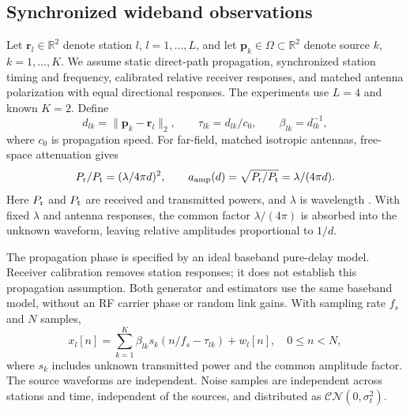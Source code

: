 \documentclass[a4paper,fleqn,review]{cas-sc}
\newcommand{\R}{\mathbb R}
\begin{document}
\subsection{Synchronized wideband observations}
Let $\bm r_l\in\R^2$ denote station $l$, $l=1,\ldots,L$, and let $\bm p_k\in\Omega\subset\R^2$ denote source $k$, $k=1,\ldots,K$. We assume static direct-path propagation, synchronized station timing and frequency, calibrated relative receiver responses, and matched antenna polarization with equal directional responses. The experiments use $L=4$ and known $K=2$. Define
\begin{equation}
d_{lk}=\|\bm p_k-\bm r_l\|_2,\qquad
\tau_{lk}=d_{lk}/c_0,\qquad \beta_{lk}=d_{lk}^{-1},
\label{en:distance}
\end{equation}
where $c_0$ is propagation speed. For far-field, matched isotropic antennas, free-space attenuation gives
\begin{equation}
P_{\rm r}/P_{\rm t}=(\lambda/4\pi d)^2,\qquad
a_{\rm amp}(d)=\sqrt{P_{\rm r}/P_{\rm t}}=\lambda/(4\pi d).
\label{en:freespace}
\end{equation}
Here $P_{\rm r}$ and $P_{\rm t}$ are received and transmitted powers, and $\lambda$ is wavelength \cite{ITURP5252024}. With fixed $\lambda$ and antenna responses, the common factor $\lambda/(4\pi)$ is absorbed into the unknown waveform, leaving relative amplitudes proportional to $1/d$.

The propagation phase is specified by an ideal baseband pure-delay model. Receiver calibration removes station responses; it does not establish this propagation assumption. Both generator and estimators use the same baseband model, without an RF carrier phase or random link gains. With sampling rate $f_s$ and $N$ samples,
\begin{equation}
x_l[n]=\sum_{k=1}^K\beta_{lk}s_k(n/f_s-\tau_{lk})+w_l[n],
\quad 0\le n<N,
\end{equation}
where $s_k$ includes unknown transmitted power and the common amplitude factor. The source waveforms are independent. Noise samples are independent across stations and time, independent of the sources, and distributed as $\mathcal{CN}(0,\sigma_t^2)$.
\end{document}
